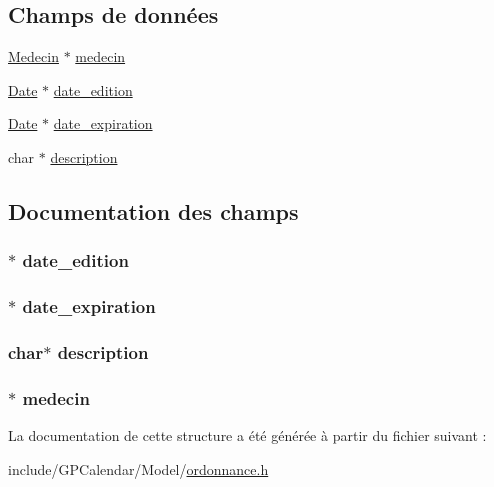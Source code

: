 \subsection*{Champs de données}
\begin{DoxyCompactItemize}
\item 
\hyperlink{struct_medecin}{Medecin} $\ast$ \hyperlink{struct_ordonnance_a59131973441fcf6250df021bcf96d17c}{medecin}
\item 
\hyperlink{struct_date}{Date} $\ast$ \hyperlink{struct_ordonnance_aa5093841fb5268f587e2ca60b5c3b4ef}{date\-\_\-edition}
\item 
\hyperlink{struct_date}{Date} $\ast$ \hyperlink{struct_ordonnance_aebd9ad8d48f13c9f6271ff87c78f1cb5}{date\-\_\-expiration}
\item 
char $\ast$ \hyperlink{struct_ordonnance_a8444d6e0dfe2bbab0b5e7b24308f1559}{description}
\end{DoxyCompactItemize}


\subsection{Documentation des champs}
\hypertarget{struct_ordonnance_aa5093841fb5268f587e2ca60b5c3b4ef}{
\subsubsection[{date\-\_\-edition}]{$\ast$ date\-\_\-edition}}\label{struct_ordonnance_aa5093841fb5268f587e2ca60b5c3b4ef}
\hypertarget{struct_ordonnance_aebd9ad8d48f13c9f6271ff87c78f1cb5}{
\subsubsection[{date\-\_\-expiration}]{$\ast$ date\-\_\-expiration}}\label{struct_ordonnance_aebd9ad8d48f13c9f6271ff87c78f1cb5}
\hypertarget{struct_ordonnance_a8444d6e0dfe2bbab0b5e7b24308f1559}{
\subsubsection[{description}]{\setlength{\rightskip}{0pt plus 5cm}char$\ast$ description}}\label{struct_ordonnance_a8444d6e0dfe2bbab0b5e7b24308f1559}
\hypertarget{struct_ordonnance_a59131973441fcf6250df021bcf96d17c}{
\subsubsection[{medecin}]{$\ast$ medecin}}\label{struct_ordonnance_a59131973441fcf6250df021bcf96d17c}


La documentation de cette structure a été générée à partir du fichier suivant \-:\begin{DoxyCompactItemize}
\item 
include/\-G\-P\-Calendar/\-Model/\hyperlink{ordonnance_8h}{ordonnance.\-h}\end{DoxyCompactItemize}
